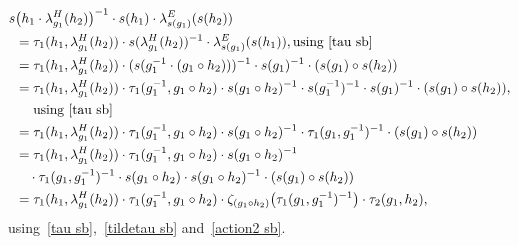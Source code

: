 \documentclass{jonasart}
\theoremstyle{plain}
\begin{document}
	\begin{align}
		s&\big(h_1\cdot \lambda^H_{g_1}(h_2 )\big)^{-1} \cdot s(h_1 )\cdot \lambda^E_{s(g_1 )}(s(h_2 )) \nonumber\\
		&=\tau_1 (h_1,\lambda^H_{g_1}(h_2 )) \cdot s(\lambda^H_{g_1}(h_2 ))^{-1} \cdot \lambda^E_{s(g_1 )}(s(h_1 )), \text{using~\eqref{tau sb}}\nonumber\\
		&=\tau_1 (h_1,\lambda^H_{g_1}(h_2 ))\cdot (s(g_1^{-1}\cdot (g_1\circ h_2 )))^{-1}\cdot s(g_1 )^{-1} \cdot (s(g_1 )\circ s(h_2 ))\nonumber\\
		&=\tau_1 (h_1,\lambda^H_{g_1}(h_2 ))\cdot \tau_1 (g_1^{-1},g_1\circ h_2 ) \cdot s(g_1\circ h_2 )^{-1} \cdot s(g_1^{-1})^{-1}\cdot s(g_1 )^{-1} \cdot (s(g_1 )\circ s(h_2 )), \nonumber\\
		&\quad \text{ using \eqref{tau sb}}\nonumber\\
		&=\tau_1 (h_1,\lambda^H_{g_1}(h_2 ))\cdot \tau_1 (g_1^{-1},g_1\circ h_2 )\cdot s(g_1\circ h_2 )^{-1}\cdot \tau_1 (g_1,g_1^{-1})^{-1} \cdot (s(g_1 )\circ s(h_2 ))\nonumber\\
		&=\tau_1 (h_1,\lambda^H_{g_1}(h_2 ))\cdot \tau_1 (g_1^{-1},g_1\circ h_2 )\cdot s(g_1\circ h_2 )^{-1} \nonumber\\
		&\quad\cdot \tau_1 (g_1,g_1^{-1})^{-1}\cdot s(g_1\circ h_2 )\cdot s(g_1\circ h_2 )^{-1}\cdot (s(g_1 )\circ s(h_2 ))\nonumber\\
		&=\tau_1 (h_1,\lambda^H_{g_1}(h_2 ))\cdot \tau_1 (g_1^{-1},g_1\circ h_2 )\cdot \zeta_{(g_1\circ h_2 )}\big(\tau_1 (g_1,g_1^{-1})^{-1}\big)\cdot \tau_2 (g_1, h_2 ),\label{tau des1}
	\end{align}
	using~\eqref{tau sb},~\eqref{tildetau sb} and~\eqref{action2 sb}. 
\par
\end{document}
